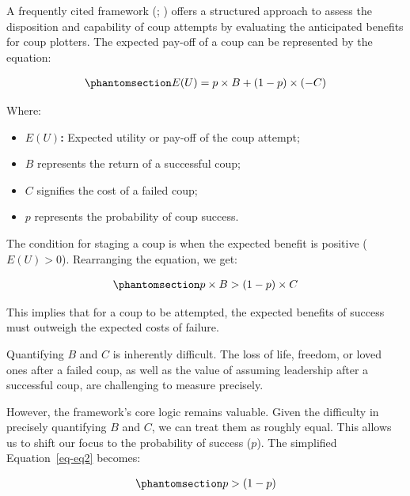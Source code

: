 \documentclass[
  12pt,
]{report}
\providecommand{\tightlist}{%
  \setlength{\itemsep}{0pt}\setlength{\parskip}{0pt}}\usepackage{longtable,booktabs,array}
\begin{document}
A frequently cited framework (; )
offers a structured approach to assess the disposition and capability of
coup attempts by evaluating the anticipated benefits for coup plotters.
The expected pay-off of a coup can be represented by the equation:

\begin{equation}\phantomsection\label{eq-eq1}{
\begin{aligned}
E(U) = p \times B + (1 - p) \times (-C)
\end{aligned}
}\end{equation}

Where:

\begin{itemize}
\tightlist
\item
  \(E(U)\)\textbf{:} Expected utility or pay-off of the coup attempt;
\item
  \(B\) represents the return of a successful coup;
\item
  \(C\) signifies the cost of a failed coup;
\item
  \(p\) represents the probability of coup success.
\end{itemize}

The condition for staging a coup is when the expected benefit is
positive (\(E(U) > 0\)). Rearranging the equation, we get:

\begin{equation}\phantomsection\label{eq-eq2}{
\begin{aligned}
p \times B > (1 - p) \times C
\end{aligned}
}\end{equation}

This implies that for a coup to be attempted, the expected benefits of
success must outweigh the expected costs of failure.

Quantifying \(B\) and \(C\) is inherently difficult. The loss of life,
freedom, or loved ones after a failed coup, as well as the value of
assuming leadership after a successful coup, are challenging to measure
precisely.

However, the framework's core logic remains valuable. Given the
difficulty in precisely quantifying \(B\) and \(C\), we can treat them
as roughly equal. This allows us to shift our focus to the probability
of success (\(p\)). The simplified Equation~\ref{eq-eq2} becomes:

\begin{equation}\phantomsection\label{eq-eq3}{
\begin{aligned}
p > (1-p)
\end{aligned}
}\end{equation}
\end{document}

